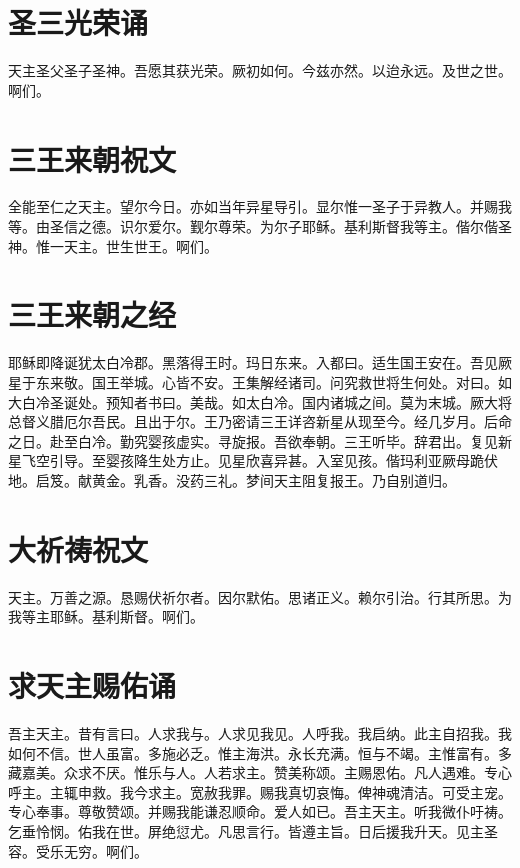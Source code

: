 \documentclass[UTF8,17pt]{ctexart}
\begin{document}
\section{圣三光荣诵}

天主圣⽗圣⼦圣神。吾愿其获光荣。厥初如何。今兹亦然。以迨永远。及世之世。啊们。

\section{三王来朝祝⽂}

全能⾄仁之天主。望尔今⽇。亦如当年异星导引。显尔惟⼀圣⼦于异教⼈。并赐我等。由圣信之德。识尔爱尔。觐尔尊荣。为尔⼦耶稣。基利斯督我等主。偕尔偕圣神。惟⼀天主。世⽣世王。啊们。

\section{三王来朝之经}

耶稣即降诞犹太⽩冷郡。⿊落得王时。玛⽇东来。⼊都曰。适⽣国王安在。吾见厥星于东来敬。国王举城。⼼皆不安。王集解经诸司。问究救世将⽣何处。对曰。如⼤⽩冷圣诞处。预知者书⽈。美哉。如太⽩冷。国内诸城之间。莫为末城。厥⼤将总督义腊厄尔吾民。且出于尔。王乃密请三王详咨新星从现⾄今。经⼏岁⽉。后命之⽇。赴⾄⽩冷。勤究婴孩虚实。寻旋报。吾欲奉朝。三王听毕。辞君出。复见新星飞空引导。⾄婴孩降⽣处⽅⽌。见星欣喜异甚。⼊室见孩。偕玛利亚厥母跪伏地。启笈。献黄⾦。乳⾹。没药三礼。梦间天主阻复报王。乃⾃别道归。

\section{⼤祈祷祝⽂}

天主。万善之源。恳赐伏祈尔者。因尔默佑。思诸正义。赖尔引治。⾏其所思。为我等主耶稣。基利斯督。啊们。

\section{求天主赐佑诵}

吾主天主。昔有⾔曰。⼈求我与。⼈求见我见。⼈呼我。我启纳。此主⾃招我。我如何不信。世⼈虽富。多施必乏。惟主海洪。永长充满。恒与不竭。主惟富有。多藏嘉美。众求不厌。惟乐与⼈。⼈若求主。赞美称颂。主赐恩佑。凡⼈遇难。专⼼呼主。主辄申救。我今求主。宽赦我罪。赐我真切哀悔。俾神魂清洁。可受主宠。专⼼奉事。尊敬赞颂。并赐我能谦忍顺命。爱⼈如已。吾主天主。听我微仆吁祷。乞垂怜悯。佑我在世。屏绝愆尤。凡思⾔⾏。皆遵主旨。⽇后援我升天。见主圣容。受乐⽆穷。啊们。
\end{document}

